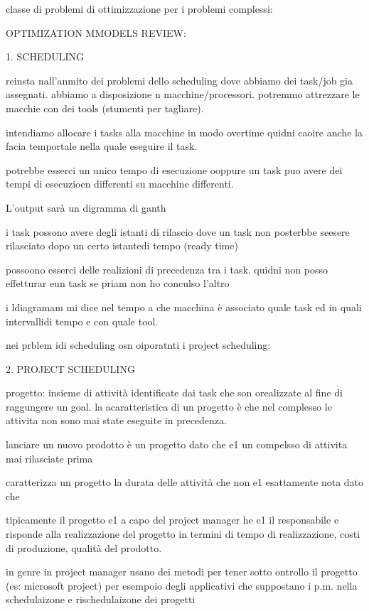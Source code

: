 classe di problemi di ottimizzazione per i problemi complessi:


OPTIMIZATION MMODELS REVIEW:

1. SCHEDULING

reinsta nall'anmito dei problemi dello scheduling dove abbiamo dei task/job gia assegnati. abbiamo a disposizione n macchine/processori. potremmo attrezzare le macchie con dei tools (stumenti per tagliare).


intendiamo allocare i tasks alla macchine in modo overtime quidni caoire anche la facia temportale nella quale eseguire il task.

potrebbe esserci un unico tempo di esecuzione ooppure un task puo avere dei tempi di esecuzioen differenti su macchine differenti. 

L'output sarà un digramma di ganth

i task possono avere degli istanti di rilascio dove un task non posterbbe seesere rilasciato dopo un certo istantedi tempo (ready time)

possoono esserci delle realizioni di precedenza tra i task. quidni non posso effetturar eun task se priam non ho conculso l'altro

i ldiagramam mi dice nel tempo a che macchina è associato quale task ed in quali intervallidi tempo e con quale tool.





nei prblem idi scheduling osn oiporatnti i project scheduling:

2. PROJECT SCHEDULING

progetto: insieme di attività identificate dai task che son orealizzate al fine di raggungere un goal. la acaratteristica di un progetto è che nel complesso le attivita non sono mai state eseguite in precedenza.


lanciare un nuovo prodotto è un progetto dato che e1 un compelsso di attivita mai rilasciate prima

caratterizza un progetto la durata delle attività che non e1 esattamente nota dato che 

tipicamente il progetto e1 a capo del project manager he e1 il responsabile e risponde alla realizzazione del progetto in termini di tempo di realizzazione, costi di produzione, qualità del prodotto.

in genre in project manager usano dei metodi per tener sotto ontrollo il progetto (es: microsoft project) per esempoio degli applicativi che suppostano i p.m. nella schedulaizone e rischedulaizone dei progetti 



